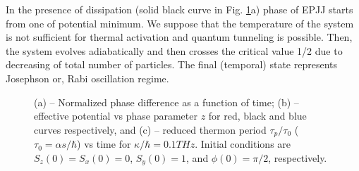 \documentclass[aps, pre, preprint, groupedaddress, superscriptaddress, showkeys, showpacs] {revtex4-1}
\begin{document}
In the presence of dissipation (solid black curve in Fig. \ref{pic:phase}a) phase of EPJJ starts from one of potential  minimum. We suppose that the temperature of the system is not sufficient for thermal activation and quantum tunneling is possible. Then, the system evolves adiabatically and then  crosses the critical value 1/2
due to decreasing of total number of particles. The final (temporal) state represents Josephson or, Rabi oscillation regime.
%
%
%
\begin{figure}[ht]
\caption{(a) -- Normalized phase difference as a function of time; (b) -- effective potential vs phase parameter $z$ for red, black and blue curves respectively, and (c) -- reduced thermon period $\tau_{p} / \tau_0$ ($\tau_0 = \alpha s / \hbar$) vs time for $\kappa/\hbar = 0.1 THz$. 
Initial conditions are $S_z(0) = S_x(0) = 0$, $S_y(0) = 1$, and $\phi(0) = \pi / 2$, respectively.
\label{pic:phase}}
\end{figure}
%
%
\end{document}
